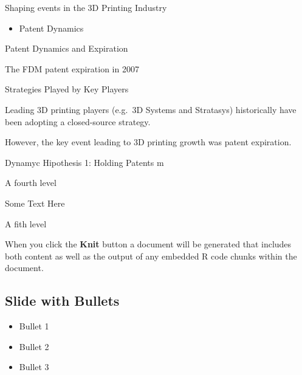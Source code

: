 \documentclass[ignorenonframetext,]{beamer}
\providecommand{\tightlist}{%
  \setlength{\itemsep}{0pt}\setlength{\parskip}{0pt}}
\begin{document}
\begin{frame}{Shaping events in the 3D Printing Industry}

\begin{itemize}
\tightlist
\item
  Patent Dynamics
\end{itemize}

\begin{block}{Patent Dynamics and Expiration}

The FDM patent expiration in 2007

\end{block}

\begin{block}{Strategies Played by Key Players}

Leading 3D printing players (e.g.~3D Systems and Stratasys) historically
have been adopting a closed-source strategy.

However, the key event leading to 3D printing growth was patent
expiration.

\begin{block}{Dynamyc Hipothesis 1: Holding Patents m}

\end{block}

\end{block}

\begin{block}{A fourth level}

Some Text Here

\begin{block}{A fith level}

When you click the \textbf{Knit} button a document will be generated
that includes both content as well as the output of any embedded R code
chunks within the document.

\end{block}

\end{block}

\end{frame}

\subsection{Slide with Bullets}\label{slide-with-bullets}

\begin{itemize}
\tightlist
\item
  Bullet 1
\item
  Bullet 2
\item
  Bullet 3
\end{itemize}
\end{document}
